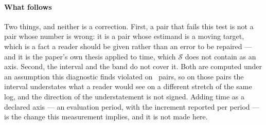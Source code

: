\paragraph{What follows}
Two things, and neither is a correction. First, a pair that fails this test is
not a pair whose number is wrong: it is a pair whose estimand is a moving
target, which is a fact a reader should be given rather than an error to be
repaired --- and it is the paper's own thesis applied to time, which
$\mathcal{S}$ does not contain as an axis. Second, the interval and the band
do not cover it. Both are computed under an assumption this diagnostic finds
violated on \nDrifts\ pairs, so on those pairs the interval understates what a
reader would see on a different stretch of the same log, and the direction of
the understatement is not signed. Adding time as a declared axis --- an
evaluation period, with the increment reported per period --- is the change
this measurement implies, and it is not made here.
